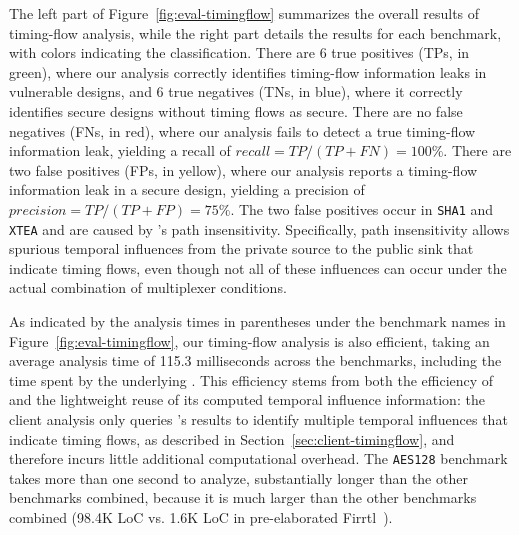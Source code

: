 The left part of Figure~\ref{fig:eval-timingflow} summarizes the overall results of timing-flow analysis, while the right part details the results for each benchmark, with colors indicating the classification.
There are 6 true positives (TPs, in green), where our analysis correctly identifies timing-flow information leaks in vulnerable designs, and 6 true negatives (TNs, in blue), where it correctly identifies secure designs without timing flows as secure.
There are no false negatives (FNs, in red), where our analysis fails to detect a true timing-flow information leak, yielding a recall of $\mathit{recall} = \mathit{TP}/(\mathit{TP}+\mathit{FN}) = 100\%$.
There are two false positives (FPs, in yellow), where our analysis reports a timing-flow information leak in a secure design, yielding a precision of $\mathit{precision} = \mathit{TP}/(\mathit{TP}+\mathit{FP}) = 75\%$.
The two false positives occur in \texttt{SHA1} and \texttt{XTEA} and are caused by \tia's path insensitivity.
Specifically, path insensitivity allows spurious temporal influences from the private source to the public sink that indicate timing flows, even though not all of these influences can occur under the actual combination of multiplexer conditions.

As indicated by the analysis times in parentheses under the benchmark names in Figure~\ref{fig:eval-timingflow}, our timing-flow analysis is also efficient, taking an average analysis time of 115.3 milliseconds across the benchmarks, including the time spent by the underlying \tia.
This efficiency stems from both the efficiency of \tia and the lightweight reuse of its computed temporal influence information: the client analysis only queries \tia's results to identify multiple temporal influences that indicate timing flows, as described in Section~\ref{sec:client-timingflow}, and therefore incurs little additional computational overhead.
The \texttt{AES128} benchmark takes more than one second to analyze, substantially longer than the other benchmarks combined, because it is much larger than the other benchmarks combined (98.4K LoC vs. 1.6K LoC in pre-elaborated Firrtl~\cite{izraelevitz_reusability_2017}).

